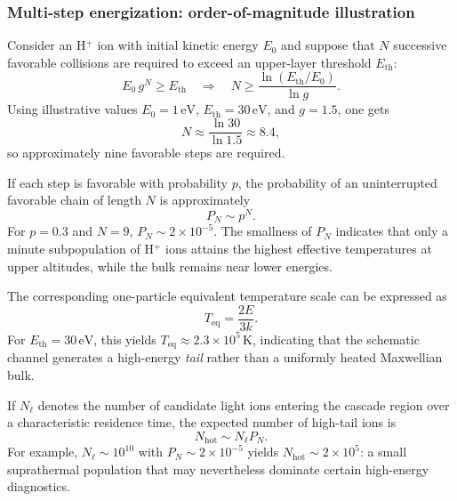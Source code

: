 \documentclass[11pt,a4paper]{article}
\begin{document}
\subsubsection{Multi-step energization: order-of-magnitude illustration}
\label{sec:multistep-ion}
Consider an H$^+$ ion with initial kinetic energy $E_0$ and suppose that $N$ successive favorable collisions are required to exceed an upper-layer threshold $E_{\mathrm{th}}$:
\begin{equation}
E_0\,g^N\ge E_{\mathrm{th}}
\quad\Rightarrow\quad
N\ge \frac{\ln(E_{\mathrm{th}}/E_0)}{\ln g}.
\end{equation}
Using illustrative values $E_0=1\,\mathrm{eV}$, $E_{\mathrm{th}}=30\,\mathrm{eV}$, and $g=1.5$, one gets
\begin{equation}
N\approx \frac{\ln 30}{\ln 1.5}\approx 8.4,
\end{equation}
so approximately nine favorable steps are required.

If each step is favorable with probability $p$, the probability of an uninterrupted favorable chain of length $N$ is approximately
\begin{equation}
P_N\sim p^N.
\end{equation}
For $p=0.3$ and $N=9$, $P_N\sim 2\times10^{-5}$. The smallness of $P_N$ indicates that only a minute subpopulation of H$^+$ ions attains the highest effective temperatures at upper altitudes, while the bulk remains near lower energies.

The corresponding one-particle equivalent temperature scale can be expressed as
\begin{equation}
T_{\mathrm{eq}}=\frac{2E}{3k}.
\end{equation}
For $E_{\mathrm{th}}=30\,\mathrm{eV}$, this yields $T_{\mathrm{eq}}\approx 2.3\times 10^5\,\mathrm{K}$, indicating that the schematic channel generates a high-energy \emph{tail} rather than a uniformly heated Maxwellian bulk.

If $N_{\ell}$ denotes the number of candidate light ions entering the cascade region over a characteristic residence time, the expected number of high-tail ions is
\begin{equation}
N_{\mathrm{hot}}\sim N_{\ell}P_N.
\end{equation}
For example, $N_{\ell}\sim 10^{10}$ with $P_N\sim 2\times10^{-5}$ yields $N_{\mathrm{hot}}\sim 2\times10^5$: a small suprathermal population that may nevertheless dominate certain high-energy diagnostics.
\end{document}
